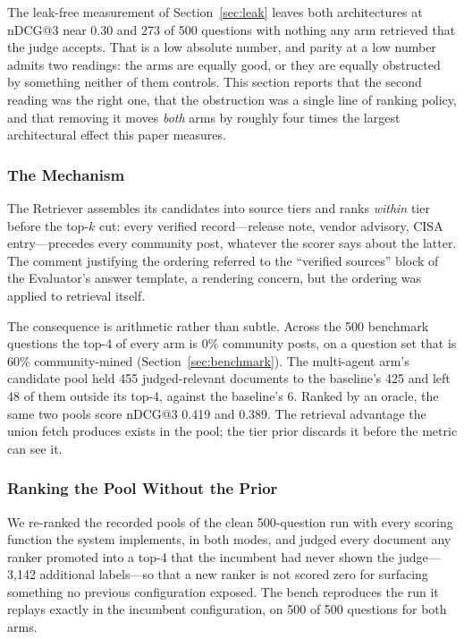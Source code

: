\documentclass[acmsmall,review,anonymous,screen]{acmart}
\begin{document}
The leak-free measurement of Section~\ref{sec:leak} leaves both architectures
at nDCG@3 near 0.30 and 273 of 500 questions with nothing any arm retrieved
that the judge accepts. That is a low absolute number, and parity at a low
number admits two readings: the arms are equally good, or they are equally
obstructed by something neither of them controls. This section reports that the
second reading was the right one, that the obstruction was a single line of
ranking policy, and that removing it moves \emph{both} arms by roughly four
times the largest architectural effect this paper measures.

\subsubsection{The Mechanism}

The Retriever assembles its candidates into source tiers and ranks
\emph{within} tier before the top-$k$ cut: every verified record---release
note, vendor advisory, CISA entry---precedes every community post, whatever the
scorer says about the latter. The comment justifying the ordering referred to
the ``verified sources'' block of the Evaluator's answer template, a rendering
concern, but the ordering was applied to retrieval itself.

The consequence is arithmetic rather than subtle. Across the 500 benchmark
questions the top-4 of every arm is 0\% community posts, on a question set that
is 60\% community-mined (Section~\ref{sec:benchmark}). The multi-agent arm's
candidate pool held 455 judged-relevant documents to the baseline's 425 and
left 48 of them outside its top-4, against the baseline's 6. Ranked by an
oracle, the same two pools score nDCG@3 0.419 and 0.389. The retrieval
advantage the union fetch produces exists in the pool; the tier prior discards
it before the metric can see it.

\subsubsection{Ranking the Pool Without the Prior}

We re-ranked the recorded pools of the clean 500-question run with every
scoring function the system implements, in both modes, and judged every
document any ranker promoted into a top-4 that the incumbent had never shown
the judge---3{,}142 additional labels---so that a new ranker is not scored zero
for surfacing something no previous configuration exposed. The bench reproduces
the run it replays exactly in the incumbent configuration, on 500 of 500
questions for both arms.
\end{document}
